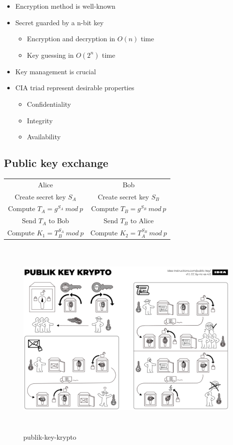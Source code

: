 \begin{itemize}
\item Encryption method is well-known
\item Secret guarded by a n-bit key
  \begin{itemize}
    \item Encryption and decryption in $O(n)$ time
    \item Key guessing in $O(2^n)$ time
  \end{itemize}
\item Key management is crucial
\item CIA triad represent desirable properties
  \begin{itemize}
  \item Confidentiality
  \item Integrity
  \item Availability
  \end{itemize}
\end{itemize}

\subsection{Public key exchange}
\begin{center}
\begin{tabular}{ c c }
 Alice & Bob \\
 Create secret key $S_A$ & Create secret key $S_B$ \\
 Compute $T_A=g^{S_A} \: mod \: p$ & Compute $T_B=g^{S_B} \: mod \: p$ \\
 Send $T_A$ to Bob & Send $T_B$ to Alice \\
 Compute $K_1=T_B^{S_A} \: mod \: p$ & Compute $K_2=T_A^{S_B} \: mod \: p$ \\
\end{tabular}
\end{center}

\begin{figure}[h]
    \vspace{10mm}
    \centering
    \includegraphics[width=16cm, height=10cm]{image/publik-key-krypto.png}
    \caption{publik-key-krypto}
\end{figure}

